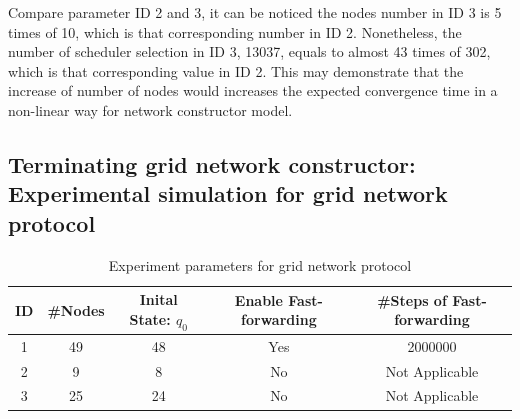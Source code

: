 \par \noindent
Compare parameter ID 2 and 3, it can be noticed the nodes number in ID 3 is 5 times of 10, which is that corresponding number in ID 2.
Nonetheless, the number of scheduler selection in ID 3, 13037, equals to almost 43 times of 302, which is that corresponding value in ID 2.
This may demonstrate that the increase of number of nodes would increases the expected convergence time in a non-linear way for network constructor model.

\subsection{Terminating grid network constructor: Experimental simulation for grid network protocol}
\FloatBarrier
\begin{table}[H]
\centering
\caption{Experiment parameters for grid network protocol}
\label{my-label}
\begin{tabular}{|c|c|c|c|c|}
\hline
ID & \#Nodes & Inital State: $q_{0}$      & Enable Fast-forwarding & \#Steps of  Fast-forwarding \\ \hline
1  & 49      & 48                         & Yes                    & 2000000                     \\ \hline
2  & 9       & 8                          & No                     & Not Applicable              \\ \hline
3  & 25      & 24                         & No                     & Not Applicable              \\ \hline
\end{tabular}
\end{table}

